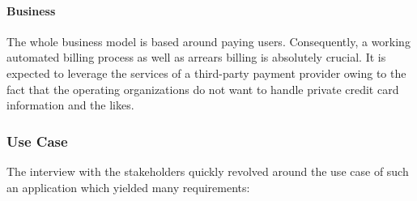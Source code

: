 \documentclass[12pt,a4paper,twoside]{report}
\begin{document}
\paragraph{Business}
The whole business model is based around paying users. Consequently,
a working automated billing process as well as arrears billing is absolutely
crucial. It is expected to leverage the services of a third-party payment
provider owing to the fact that the operating organizations do not want to
handle private credit card information and the likes.


\subsubsection{Use Case}

The interview with the stakeholders quickly revolved around the use case
of such an application which yielded many requirements:\\
\end{document}
